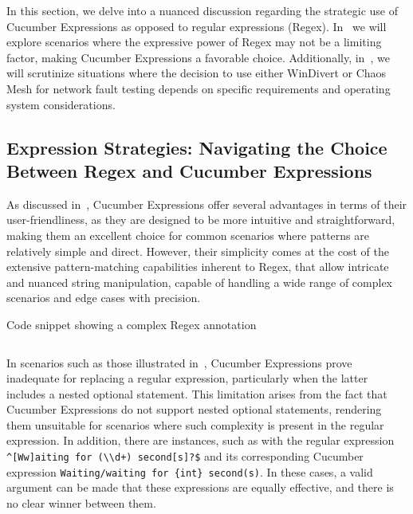 In this section, we delve into a nuanced discussion regarding the strategic use of Cucumber Expressions as opposed to regular expressions (\ac{Regex}). In~ we will explore scenarios where the expressive power of \ac{Regex} may not be a limiting factor, making Cucumber Expressions a favorable choice. Additionally, in~, we will scrutinize situations where the decision to use either WinDivert or Chaos Mesh for network fault testing depends on specific requirements and operating system considerations.

\subsection{Expression Strategies: Navigating the Choice Between \ac{Regex} and Cucumber Expressions}
\label{subsec:expression-strategies}

As discussed in~, Cucumber Expressions offer several advantages in terms of their user-friendliness, as they are designed to be more intuitive and straightforward, making them an excellent choice for common scenarios where patterns are relatively simple and direct. However, their simplicity comes at the cost of the extensive pattern-matching capabilities inherent to \ac{Regex}, that allow intricate and nuanced string manipulation, capable of handling a wide range of complex scenarios and edge cases with precision. 

\begin{listing}[!ht]
\caption{Code snippet showing a complex \ac{Regex} annotation}
\label{lst:complexRegex}
\inputminted{java}{files/code/complexRegex.java}
\end{listing}

In scenarios such as those illustrated in~, Cucumber Expressions prove inadequate for replacing a regular expression, particularly when the latter includes a nested optional statement. This limitation arises from the fact that Cucumber Expressions do not support nested optional statements, rendering them unsuitable for scenarios where such complexity is present in the regular expression. In addition, there are instances, such as with the regular expression \verb|^[Ww]aiting for (\\d+) second[s]?$| and its corresponding Cucumber expression \verb|Waiting/waiting for {int} second(s)|. In these cases, a valid argument can be made that these expressions are equally effective, and there is no clear winner between them.


